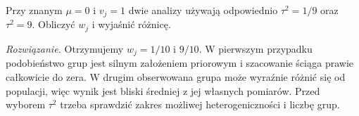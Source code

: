\begin{zadanie}
Przy znanym $\mu=0$ i $v_j=1$ dwie analizy używają
odpowiednio $\tau^2=1/9$ oraz $\tau^2=9$.
Obliczyć $w_j$ i wyjaśnić różnicę.
\par\emph{Rozwiązanie.} Otrzymujemy $w_j=1/10$ i $9/10$.
W pierwszym przypadku podobieństwo grup jest silnym
założeniem priorowym i szacowanie ściąga prawie całkowicie
do zera. W drugim obserwowana grupa może wyraźnie
różnić się od populacji, więc wynik jest bliski średniej
z jej własnych pomiarów. Przed wyborem $\tau^2$ trzeba
sprawdzić zakres możliwej heterogeniczności i liczbę grup.
\end{zadanie}


